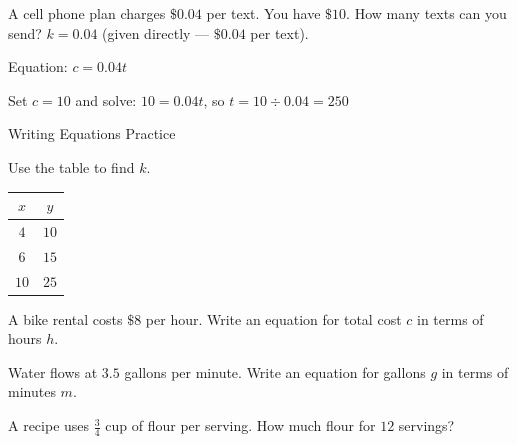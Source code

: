 \begin{stepExample}{A cell phone plan charges $\$0.04$ per text. You have $\$10$. How many texts can you send?}
     $k = 0.04$ (given directly — $\$0.04$ per text).

     Equation: $c = 0.04t$

     Set $c = 10$ and solve: $10 = 0.04t$, so $t = 10 \div 0.04 = 250$
\end{stepExample}


\newpage
\begin{stepPractice}{Writing Equations Practice}
    \resetProblems

    \prob Use the table to find $k$. \answerBlank[2cm]
    \begin{center}
    \begin{tabular}{|c|c|}
    \hline $x$ & $y$ \\ \hline $4$ & $10$ \\ $6$ & $15$ \\ $10$ & $25$ \\ \hline
    \end{tabular}
    \end{center}

    \prob A bike rental costs $\$8$ per hour. Write an equation for total cost $c$ in terms of hours $h$. \answerBlank[3cm]

    \prob Water flows at $3.5$ gallons per minute. Write an equation for gallons $g$ in terms of minutes $m$. \answerBlank[3cm]

    \prob A recipe uses $\frac{3}{4}$ cup of flour per serving. How much flour for $12$ servings? \answerBlank[2.5cm]

\end{stepPractice}
